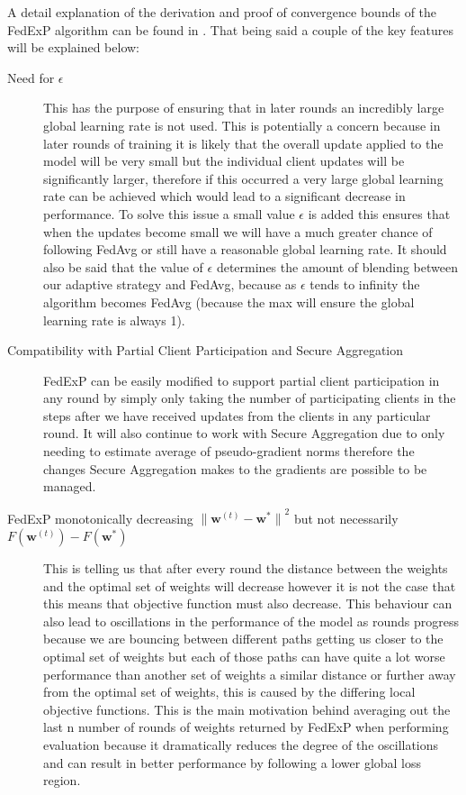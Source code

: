 \documentclass{article}
\begin{document}
A detail explanation of the derivation and proof of convergence bounds of the FedExP algorithm can be found in \cite{FedExP}.  That being said a couple of the key features will be explained below:

\begin{description}
\item[Need for $\epsilon$]{This has the purpose of ensuring that in later rounds an incredibly large global learning rate is not used.  This is potentially a concern because in later rounds of training it is likely that the overall update applied to the model will be very small but the individual client updates will be significantly larger, therefore if this occurred a very large global learning rate can be achieved which would lead to a significant decrease in performance.  To solve this issue a small value $\epsilon$ is added this ensures that when the updates become small we will have a much greater chance of following FedAvg or still have a reasonable global learning rate.  It should also be said that the value of $\epsilon$ determines the amount of blending between our adaptive strategy and FedAvg, because as $\epsilon$ tends to infinity the algorithm becomes FedAvg (because the max will ensure the global learning rate is always 1).}

\item[Compatibility with Partial Client Participation and Secure Aggregation]{FedExP can be easily modified to support partial client participation in any round by simply only taking the number of participating clients in the steps after we have received updates from the clients in any particular round.  It will also continue to work with Secure Aggregation due to only needing to estimate average of pseudo-gradient norms therefore the changes Secure Aggregation makes to the gradients are possible to be managed.}

\item[FedExP monotonically decreasing ${\lVert\textbf{w}^{(t)} - \textbf{w}^*\rVert}^2$ but not necessarily $F(\textbf{w}^{(t)}) - F(\textbf{w}^*)$]{This is telling us that after every round the distance between the weights and the optimal set of weights will decrease however it is not the case that this means that objective function must also decrease.  This behaviour can also lead to oscillations in the performance of the model as rounds progress because we are bouncing between different paths getting us closer to the optimal set of weights but each of those paths can have quite a lot worse performance than another set of weights a similar distance or further away from the optimal set of weights, this is caused by the differing local objective functions.  This is the main motivation behind averaging out the last n number of rounds of weights returned by FedExP when performing evaluation because it dramatically reduces the degree of the oscillations and can result in better performance by following a lower global loss region.}

\end{description}
\end{document}
